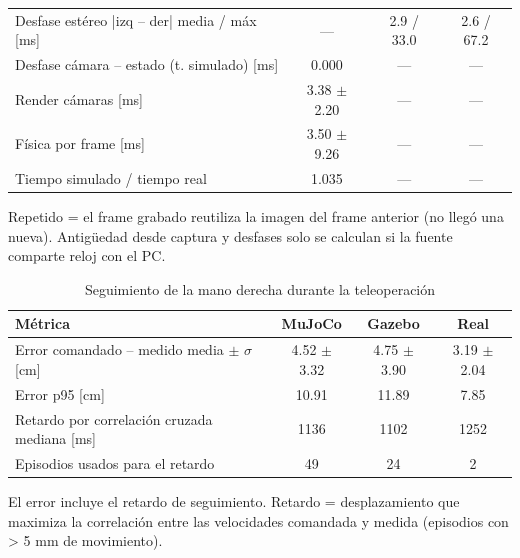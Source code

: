 \begin{table}[htbp]
\begin{tabular}{lccc}
Desfase estéreo |izq -- der| media / máx [ms] & — & 2.9 / 33.0 & 2.6 / 67.2 \\
Desfase cámara -- estado (t. simulado) [ms] & 0.000 & — & — \\
Render cámaras [ms] & 3.38 $\pm$ 2.20 & — & — \\
Física por frame [ms] & 3.50 $\pm$ 9.26 & — & — \\
Tiempo simulado / tiempo real & 1.035 & — & — \\
\bottomrule
\end{tabular}
\par\footnotesize Repetido = el frame grabado reutiliza la imagen del frame anterior (no llegó una nueva). Antigüedad desde captura y desfases solo se calculan si la fuente comparte reloj con el PC.
\end{table}

\begin{table}[htbp]
\centering\small
\caption{Seguimiento de la mano derecha durante la teleoperación}
\begin{tabular}{lccc}
\toprule
Métrica & MuJoCo & Gazebo & Real \\
\midrule
Error comandado -- medido media $\pm$ $\sigma$ [cm] & 4.52 $\pm$ 3.32 & 4.75 $\pm$ 3.90 & 3.19 $\pm$ 2.04 \\
Error p95 [cm] & 10.91 & 11.89 & 7.85 \\
Retardo por correlación cruzada mediana [ms] & 1136 & 1102 & 1252 \\
Episodios usados para el retardo & 49 & 24 & 2 \\
\bottomrule
\end{tabular}
\par\footnotesize El error incluye el retardo de seguimiento. Retardo = desplazamiento que maximiza la correlación entre las velocidades comandada y medida (episodios con > 5 mm de movimiento).
\end{table}

